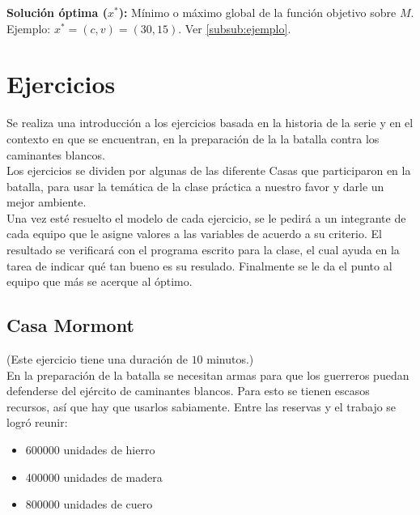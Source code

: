 \documentclass[a4paper,10pt,twocolumn]{article}
\theoremstyle{theorem}
\theoremstyle{definition}
\theoremstyle{remark}
\begin{document}
\textbf{Solución óptima ($x^*$):} Mínimo o máximo global de la función objetivo sobre $M$. Ejemplo: $x^* = (c, v) = (30, 15)$. Ver \ref{subsub:ejemplo}.

\section{Ejercicios}\label{sec:ejer}
Se realiza una introducción a los ejercicios basada en la historia de la serie y en el contexto en que se encuentran, en la preparación de la la batalla contra los caminantes blancos.\\

Los ejercicios se dividen por algunas de las diferente Casas que participaron en la batalla, para usar la temática de la clase práctica a nuestro favor y darle un mejor ambiente.\\

Una vez esté resuelto el modelo de cada ejercicio, se le pedirá a un integrante de cada equipo que le asigne valores a las variables de acuerdo a su criterio. El resultado se verificará con el programa escrito para la clase, el cual ayuda en la tarea de indicar qué tan bueno es su resulado. Finalmente se le da el punto al equipo que más se acerque al óptimo.

	\subsection{Casa Mormont}\label{subsec:ejer_1}
(Este ejercicio tiene una duración de $10$ minutos.)\\

En la preparación de la batalla se necesitan armas para que los guerreros puedan defenderse del ejército de caminantes blancos. Para esto se tienen escasos recursos, así que hay que usarlos sabiamente. Entre las reservas y el trabajo se logró reunir:

\begin{itemize}

	\item 600000 unidades de hierro
	\item 400000 unidades de madera
	\item 800000 unidades de cuero

\end{itemize}
\end{document}
